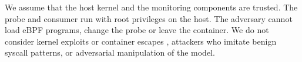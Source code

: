 We assume that the host kernel and the monitoring components are trusted. The probe and consumer run with root privileges on the host. The adversary cannot load eBPF programs, change the probe or leave the container. We do not consider kernel exploits or container escapes \parencite{P033,P039}, attackers who imitate benign syscall patterns, or adversarial manipulation of the model.
